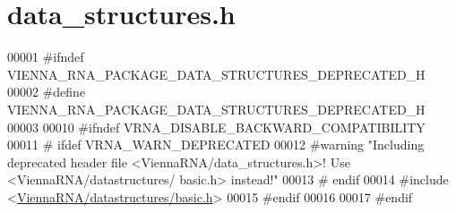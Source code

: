 \hypertarget{data__structures_8h_source}{}\section{data\+\_\+structures.\+h}
\label{data__structures_8h_source}

\begin{DoxyCode}
00001 \textcolor{preprocessor}{#ifndef VIENNA\_RNA\_PACKAGE\_DATA\_STRUCTURES\_DEPRECATED\_H}
00002 \textcolor{preprocessor}{#define VIENNA\_RNA\_PACKAGE\_DATA\_STRUCTURES\_DEPRECATED\_H}
00003 
00010 \textcolor{preprocessor}{#ifndef VRNA\_DISABLE\_BACKWARD\_COMPATIBILITY}
00011 \textcolor{preprocessor}{# ifdef VRNA\_WARN\_DEPRECATED}
00012 \textcolor{preprocessor}{#warning "Including deprecated header file <ViennaRNA/data\_structures.h>! Use <ViennaRNA/datastructures/
      basic.h> instead!"}
00013 \textcolor{preprocessor}{# endif}
00014 \textcolor{preprocessor}{#include <\hyperlink{datastructures_2basic_8h}{ViennaRNA/datastructures/basic.h}>}
00015 \textcolor{preprocessor}{#endif}
00016 
00017 \textcolor{preprocessor}{#endif}
\end{DoxyCode}
